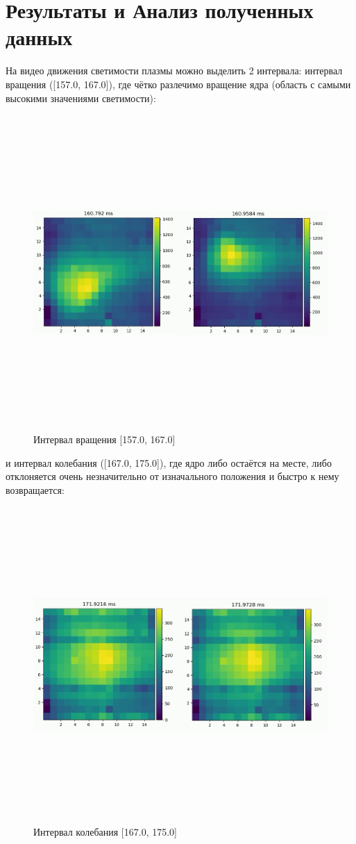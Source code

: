 \documentclass[a4paper,12pt]{article} %
\begin{document}
	\section{Результаты и Анализ полученных данных}
	На видео движения светимости плазмы можно выделить 2 интервала: интервал вращения ([157.0, 167.0]), где чётко разлечимо вращение ядра (область с самыми высокими значениями светимости):
	\begin{figure}[H]
		\centering
		\includegraphics[width = 18cm, height = 12cm]{Rot_prj.png}
		\caption{Интервал вращения [157.0, 167.0]}
		\label{fig:rot_prj}
	\end{figure}
	\parskip
	\parskip
	\parskip
	\parskip
	\parskip
	\parskip
	\parskip
	\parskip
	\parskip
	и интервал колебания ([167.0, 175.0]), где ядро либо остаётся на месте, либо отклоняется очень незначительно от изначального положения и быстро к нему возвращается:
	\begin{figure}[H]
		\centering
		\includegraphics[width = 18cm, height = 12cm]{Fluct_prj.png}
		\caption{Интервал колебания [167.0, 175.0]}
		\label{fig:fluct_prj}
	\end{figure}
\end{document}
